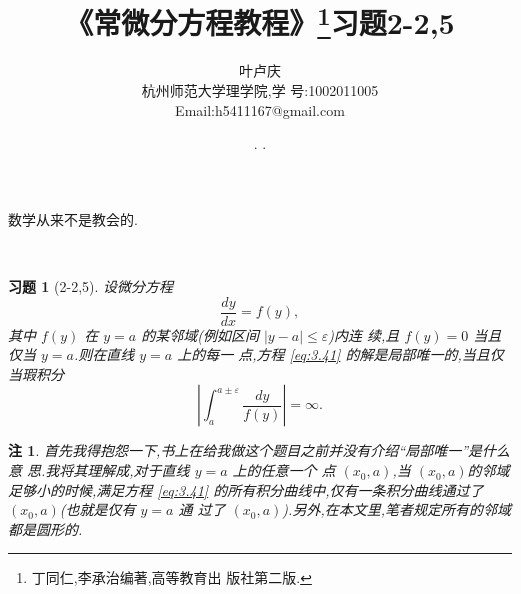 \documentclass[a4paper, 12pt]{article} %
\makeatletter
\newtheorem*{cdtheorem}{习题}
\newenvironment{exercise}
{\bigskip\begin{mdframed}[backgroundcolor=gray!40,rightline=false,leftline=false,topline=false,bottomline=false]\begin{cdtheorem}}
    {\end{cdtheorem}\end{mdframed}\bigskip}
\newtheorem{ddtheorem}{注}
\newenvironment{remark}
{\bigskip\begin{mdframed}[backgroundcolor=gray!40,rightline=false,leftline=false,topline=false,bottomline=false]\begin{ddtheorem}}
    {\end{ddtheorem}\end{mdframed}\bigskip}
\renewcommand{\maketitle}{ %
  \renewcommand\refname{参考文献}
  \newcommand{\D}{\displaystyle}\newcommand{\ri}{\Rightarrow}
  \newcommand{\ds}{\displaystyle} \renewcommand{\ni}{\noindent}
  \newcommand{\pa}{\partial} \newcommand{\Om}{\Omega}
  \newcommand{\om}{\omega} \newcommand{\sik}{\sum_{i=1}^k}
  \newcommand{\vov}{\Vert\omega\Vert} \newcommand{\Umy}{U_{\mu_i,y^i}}
  \newcommand{\lamns}{\lambda_n^{^{\scriptstyle\sigma}}}
  \newcommand{\chiomn}{\chi_{_{\Omega_n}}}
  \newcommand{\ullim}{\underline{\lim}} \newcommand{\bsy}{\boldsymbol}
  \newcommand{\mvb}{\mathversion{bold}} \newcommand{\la}{\lambda}
  \newcommand{\La}{\Lambda} \newcommand{\va}{\varepsilon}
  \newcommand{\be}{\beta} \newcommand{\al}{\alpha}
  \newcommand{\dis}{\displaystyle} \newcommand{\R}{{\mathbb R}}
  \newcommand{\N}{{\mathbb N}} \newcommand{\cF}{{\mathcal F}}
  \newcommand{\gB}{{\mathfrak B}} \newcommand{\eps}{\epsilon}
  \begin{flushright} %
    {\LARGE\@title} %

    \vspace{50pt} %

    {\large\@author} %
    \\\@date %

    \vspace{40pt} %
  \end{flushright}
}
\makeatother
\begin{document}
\title{\textbf{《常微分方程教程》\footnote{丁同仁,李承治编著,高等教育出
      版社第二版.}习题2-2,5}}
\author{\small{叶卢庆}\\{\small{杭州师范大学理学院,学
      号:1002011005}}\\{\small{Email:h5411167@gmail.com}}} %
\renewcommand{\today}{\number\year. \number\month. \number\day}
\date{\today} %
\epigraph{数学从来不是教会的.}{}
\maketitle
\begin{exercise}[2-2,5]
  设微分方程
  \begin{equation}
    \label{eq:3.41}
    \frac{dy}{dx}=f(y),
  \end{equation}
  其中 $f(y)$ 在 $y=a$ 的某邻域(例如区间 $|y-a|\leq\varepsilon$)内连
  续,且 $f(y)=0$ 当且仅当 $y=a$.则在直线 $y=a$ 上的每一
  点,方程 \eqref{eq:3.41} 的解是局部唯一的,当且仅当瑕积分
$$
|\int_a^{a\pm \varepsilon}\frac{dy}{f(y)}|=\infty.
$$
\end{exercise}
\begin{remark}
  首先我得抱怨一下,书上在给我做这个题目之前并没有介绍“局部唯一”是什么意
  思.我将其理解成,对于直线 $y=a$ 上的任意一个
  点 $(x_0,a)$,当 $(x_0,a)$的邻域足够小的时候,满足方程 \eqref{eq:3.41}
  的所有积分曲线中,仅有一条积分曲线通过了 $(x_0,a)$(也就是仅有 $y=a$ 通
  过了 $(x_0,a)$).另外,在本文里,笔者规定所有的邻域都是圆形的.
\end{remark}
\begin{comment}
  \begin{remark}
    该题目有明显的物理意义.将 $x$ 看作时间,将 $y$ 看作质点在一条直线上
    的一维位置.则$\frac{dy}{dx}=f(y)$ 表示质点在直线上的一维速度.质点的
    速度在位置区间$[a-\varepsilon,a+\varepsilon]$ 上连续(这在物理中是自
    明的,速度不会突变.),且只有在位置 $y=a$ 的地方速度才为0.且质点的速度
    是位置的函
    数.我们知道,满足如上条件的质点可能有无数种运动方式.\\

    如果质点所有的运动方式都有如下特征:当质点还没达到 $y=a$ 这个位置,但
    是已经很接近$y=a$ 这个位置的时候,如果质点每接近 $y=a$ 这个位置相同
    的距离,所花费的时间会越来越长,最后是寸步难进(虽然始终在运动),即使
    向 $y=a$ 前进哪怕是很小很小的一段距离,所消耗的时间也会惊人地多,以至
    于无论给这个质点多长的时间,质点都将无法到达$y=a$ 这个位置,那么想要
    质点在别处不可能运动到 $y=a$ 这个位置,唯一能做的就是把质点直接放
    在 $y=a$ 这个地方保持静止.
  \end{remark}
\end{comment}
\end{document}
